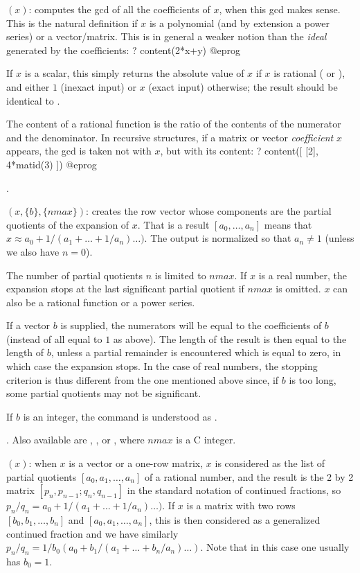 $(x)$: computes the gcd of all the coefficients of $x$,
when this gcd makes sense. This is the natural definition
if $x$ is a polynomial (and by extension a power series) or a
vector/matrix. This is in general a weaker notion than the \emph{ideal}
generated by the coefficients:
\bprog
    ? content(2*x+y)
@eprog

If $x$ is a scalar, this simply returns the absolute value of $x$ if $x$ is
rational ( or ), and either $1$ (inexact input) or $x$
(exact input) otherwise; the result should be identical to . 

The content of a rational function is the ratio of the contents of the
numerator and the denominator. In recursive structures, if a
matrix or vector \emph{coefficient} $x$ appears, the gcd is taken 
not with $x$, but with its content:
\bprog
    ? content([ [2], 4*matid(3) ])
@eprog

.

$(x,\{b\},\{nmax\})$: creates the row vector whose
components are the partial quotients of the 
expansion of $x$. That is a result $[a_0,\dots,a_n]$ means that $x \approx
a_0+1/(a_1+\dots+1/a_n)\dots)$. The output is normalized so that $a_n \neq 1$
(unless we also have $n = 0$).

The number of partial quotients $n$ is limited to $nmax$. If $x$ is a real
number, the expansion stops at the last significant partial quotient if
$nmax$ is omitted. $x$ can also be a rational function or a power series.

If a vector $b$ is supplied, the numerators will be equal to the coefficients
of $b$ (instead of all equal to $1$ as above). The length of the result is
then equal to the length of $b$, unless a partial remainder is encountered
which is equal to zero, in which case the expansion stops. In the case of
real numbers, the stopping criterion is thus different from the one mentioned
above since, if $b$ is too long, some partial quotients may not be
significant.

If $b$ is an integer, the command is understood as .

. Also available are
, , or , where $nmax$
is a C integer.

$(x)$: when $x$ is a vector or a one-row matrix, $x$
is considered as the list of partial quotients $[a_0,a_1,\dots,a_n]$ of a
rational number, and the result is the 2 by 2 matrix
$[p_n,p_{n-1};q_n,q_{n-1}]$ in the standard notation of continued fractions,
so $p_n/q_n=a_0+1/(a_1+\dots+1/a_n)\dots)$. If $x$ is a matrix with two rows
$[b_0,b_1,\dots,b_n]$ and $[a_0,a_1,\dots,a_n]$, this is then considered as a
generalized continued fraction and we have similarly
$p_n/q_n=1/b_0(a_0+b_1/(a_1+\dots+b_n/a_n)\dots)$. Note that in this case one
usually has $b_0=1$.

